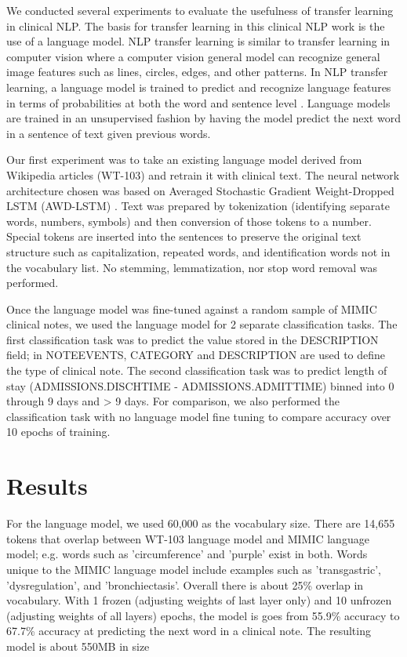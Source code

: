 \documentclass{amia}
\begin{document}
We conducted several experiments to evaluate the usefulness of transfer learning in clinical NLP. The basis for transfer learning in this clinical NLP work is the use of a language model. NLP transfer learning is similar to transfer learning in computer vision where a computer vision general model can recognize general image features such as lines, circles, edges, and other patterns. In NLP transfer learning, a language model is trained to predict and recognize language features in terms of probabilities at both the word and sentence level \cite{Bengio:2003:NPL:944919.944966}. Language models are trained in an unsupervised fashion by having the model predict the next word in a sentence of text given previous words.

Our first experiment was to take an existing language model derived from Wikipedia articles (WT-103) \cite{Merity2016Sep} and retrain it with clinical text. The neural network architecture chosen was based on Averaged Stochastic Gradient Weight-Dropped LSTM (AWD-LSTM) \cite{Merity2017Aug}. Text was prepared by tokenization (identifying separate words, numbers, symbols) and then conversion of those tokens to a number. Special tokens are inserted into the sentences to preserve the original text structure such as capitalization, repeated words, and identification words not in the vocabulary list. No stemming, lemmatization, nor stop word removal was performed.

Once the language model was fine-tuned against a random sample of MIMIC clinical notes, we used the language model for 2 separate classification tasks. The first classification task was to predict the value stored in the DESCRIPTION field; in NOTEEVENTS, CATEGORY and DESCRIPTION are used to define the type of clinical note. The second classification task was to predict length of stay (ADMISSIONS.DISCHTIME - ADMISSIONS.ADMITTIME) binned into 0 through 9 days and > 9 days. For comparison, we also performed the classification task with no language model fine tuning to compare accuracy over 10 epochs of training.

\section*{Results}

For the language model, we used 60,000 as the vocabulary size. There are 14,655 tokens that overlap between WT-103 language model and MIMIC language model; e.g. words such as 'circumference' and 'purple' exist in both. Words unique to the MIMIC language model include examples such as 'transgastric', 'dysregulation', and 'bronchiectasis'. Overall there is about 25\% overlap in vocabulary. With 1 frozen (adjusting weights of last layer only) and 10 unfrozen (adjusting weights of all layers) epochs, the model is goes from 55.9\% accuracy to 67.7\% accuracy at predicting the next word in a clinical note. The resulting model is about 550MB in size
\end{document}
